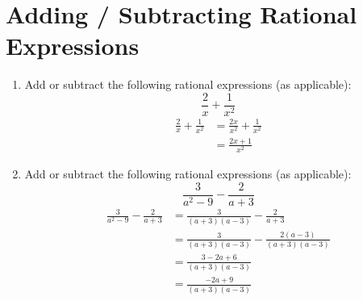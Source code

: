 \documentclass{article}
\begin{document}
\section*{Adding / Subtracting Rational Expressions}
\begin{enumerate}[resume]
    \item Add or subtract the following rational expressions (as applicable):
    \begin{equation*}
        \frac{2}{x} + \frac{1}{x^2}
    \end{equation*}
    \begin{align*}
\frac{2}{x} + \frac{1}{x^2} &= \frac{2x}{x^2} + \frac{1}{x^2} \\
&= \frac{2x + 1}{x^2}
\end{align*}

    \item Add or subtract the following rational expressions (as applicable):
    \begin{equation*}
        \frac{3}{a^2 - 9} - \frac{2}{a + 3}
    \end{equation*}
    \begin{align*}
\frac{3}{a^2 - 9} - \frac{2}{a + 3} &= \frac{3}{(a + 3)(a - 3)} - \frac{2}{a + 3} \\
&= \frac{3}{(a + 3)(a - 3)} - \frac{2(a - 3)}{(a + 3)(a - 3)} \\
&= \frac{3 - 2a + 6}{(a + 3)(a - 3)} \\
&= \frac{-2a + 9}{(a + 3)(a - 3)}
\end{align*}

\end{enumerate}
\newpage 
\end{document}
